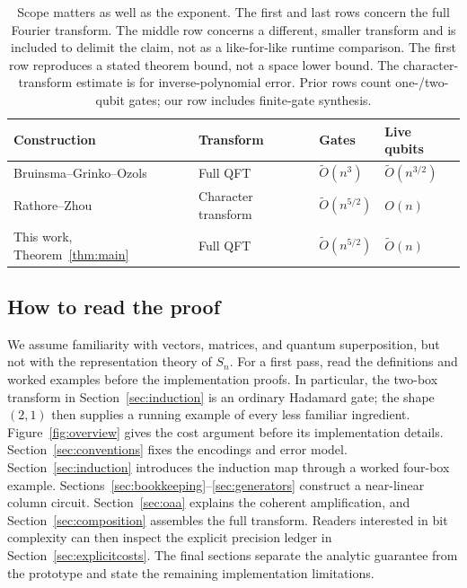 \documentclass[11pt]{article}
\theoremstyle{definition}
\newcommand{\softO}{\widetilde O}
\begin{document}
\begin{table}[t]
\centering
\small
\begin{tabularx}{\textwidth}{@{}Xlll@{}}
\toprule
Construction & Transform & Gates & Live qubits\\
\midrule
Bruinsma--Grinko--Ozols~\cite[Thm.\ 1.1]{bgo}
 & Full QFT & $\softO(n^3)$ & $\softO(n^{3/2})$\\
Rathore--Zhou~\cite[Thm.\ 5.1]{rz}
 & Character transform & $\softO(n^{5/2})$ & $O(n)$\\
This work, Theorem~\ref{thm:main}
 & Full QFT & $\softO(n^{5/2})$ & $\softO(n)$\\
\bottomrule
\end{tabularx}
\caption{Scope matters as well as the exponent. The first and last rows
concern the full Fourier transform. The middle row concerns a different,
smaller transform and is included to delimit the claim, not as a
like-for-like runtime comparison. The first row reproduces a stated
theorem bound, not a space lower bound. The character-transform estimate
is for inverse-polynomial error. Prior rows count one-/two-qubit gates;
our row includes finite-gate synthesis.}\label{tab:comparison}
\end{table}

\subsection{How to read the proof}

We assume familiarity with vectors, matrices, and quantum superposition,
but not with the representation theory of $S_n$. For a first pass, read
the definitions and worked examples before the implementation proofs.
In particular, the two-box transform in Section~\ref{sec:induction} is
an ordinary Hadamard gate; the shape $(2,1)$ then supplies a running
example of every less familiar ingredient.
Figure~\ref{fig:overview} gives the cost argument before its implementation
details. Section~\ref{sec:conventions} fixes the encodings and error model.
Section~\ref{sec:induction} introduces the induction map through a worked
four-box example. Sections~\ref{sec:bookkeeping}--\ref{sec:generators}
construct a near-linear column circuit.
Section~\ref{sec:oaa} explains the coherent amplification, and
Section~\ref{sec:composition} assembles the full transform.
Readers interested in bit complexity can then inspect the explicit
precision ledger in Section~\ref{sec:explicitcosts}.
The final sections separate the analytic guarantee from the prototype
and state the remaining implementation limitations.
\end{document}
